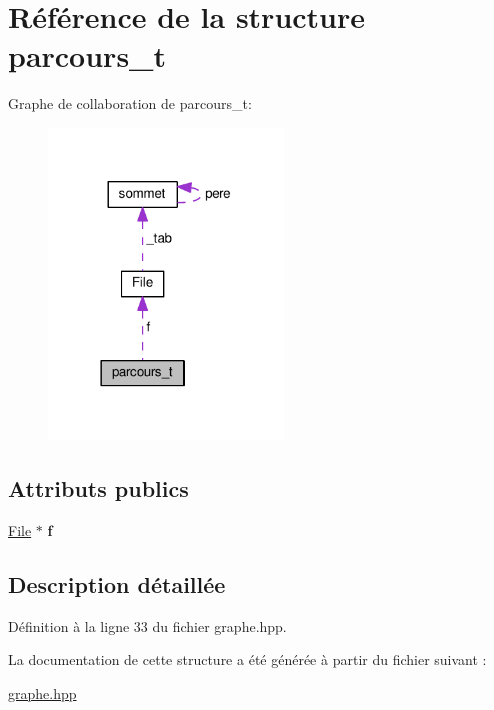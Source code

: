 \hypertarget{structparcours__t}{\section{Référence de la structure parcours\+\_\+t}
\label{structparcours__t}
}


Graphe de collaboration de parcours\+\_\+t\+:\nopagebreak
\begin{figure}[H]
\begin{center}
\leavevmode
\includegraphics[width=177pt]{structparcours__t__coll__graph}
\end{center}
\end{figure}
\subsection*{Attributs publics}
\begin{DoxyCompactItemize}
\item 
\hypertarget{structparcours__t_a0bb6da520f00c8404b61c1e5c7cf577b}{\hyperlink{classFile}{File} $\ast$ {\bfseries f}}\label{structparcours__t_a0bb6da520f00c8404b61c1e5c7cf577b}

\end{DoxyCompactItemize}


\subsection{Description détaillée}


Définition à la ligne 33 du fichier graphe.\+hpp.



La documentation de cette structure a été générée à partir du fichier suivant \+:\begin{DoxyCompactItemize}
\item 
\hyperlink{graphe_8hpp}{graphe.\+hpp}\end{DoxyCompactItemize}
